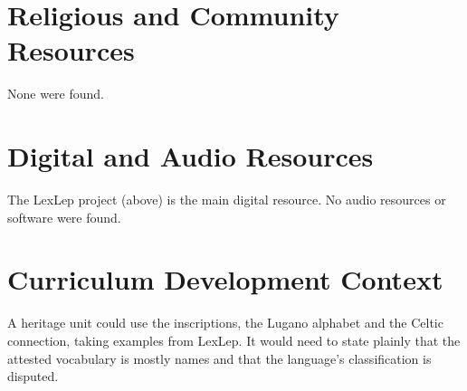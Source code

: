 \documentclass[12pt]{article}
\begin{document}
\section{Religious and Community Resources}
None were found.

\section{Digital and Audio Resources}
The LexLep project (above) is the main digital resource. No audio resources or software were found.

\section{Curriculum Development Context}
A heritage unit could use the inscriptions, the Lugano alphabet and the Celtic connection, taking examples from LexLep. It would need to state plainly that the attested vocabulary is mostly names and that the language's classification is disputed.
\end{document}
